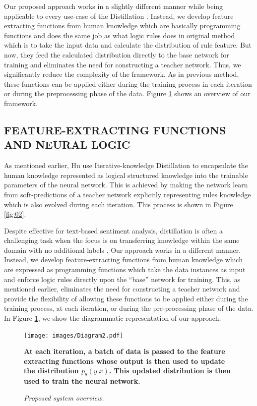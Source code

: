 \documentclass[12pt,a4paper]{article}
\begin{document}
Our proposed approach works in a slightly different manner
while being applicable to every use-case of the Distillation \cite{Hu:2019}. Instead, we develop feature extracting functions from human knowledge which are basically programming functions
and does the same job as what logic rules does in original
method which is to take the input data and calculate the
distribution of rule feature. But now, they feed the calculated
distribution directly to the base network for training and
eliminates the need for constructing a teacher network. Thus,
we significantly reduce the complexity of the framework. As
in previous method, these functions can be applied either
during the training process in each iteration or during the
preprocessing phase of the data. Figure \ref{fig:03} shows an overview of our framework.
\vspace{2mm}

\subsection{FEATURE-EXTRACTING FUNCTIONS AND NEURAL LOGIC}
As mentioned earlier, Hu \cite{Hu:2019} use Iterative-knowledge Distillation to encapsulate the human knowledge represented as logical structured knowledge into the trainable parameters of the neural network. This is achieved by making the network learn from soft-predictions of a teacher network explicitly representing rules knowledge which is also evolved during each iteration. This process is shown in Figure \ref{fig:02}.
\vspace{2 mm}

Despite effective for text-based sentiment analysis, distillation is often a challenging task when the focus is on transferring knowledge within the same domain with no additional labels \cite{chen:2017}. Our approach works in a different manner. Instead, we develop feature-extracting functions from human knowledge which are expressed as programming functions which take the data instances as input and enforce logic rules directly upon the ``base'' network for training. This, as mentioned earlier, eliminates the need for constructing a teacher network and provide the flexibility of allowing these functions to be applied either during the training process, at each iteration, or during the pre-processing phase of the data. In Figure \ref{fig:03}, we show the diagrammatic representation of our approach.
\vspace{2 mm}

\begin{figure}[!b]
\texttt{[image: images/Diagram2.pdf]}
\caption{\textit{Proposed system overview.}} \textbf{At each iteration, a batch of data is passed to the feature extracting functions whose output is then used to update the distribution $p_\theta(y|x)$. This updated distribution is then used to train the neural network.}
\label{fig:03}
\end{figure}
\end{document}
